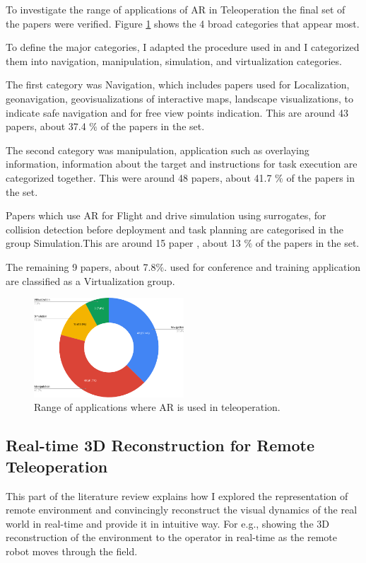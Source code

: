 To investigate the range of applications of AR in Teleoperation the final set of the papers were verified. Figure \ref{fig:range of applications} shows the 4 broad categories that appear most.
 
To define the  major categories, I adapted the procedure used in \cite{7912316} and I categorized them into navigation, manipulation, simulation, and virtualization categories.
 
The first category was Navigation, which includes papers used for Localization, geonavigation, geovisualizations of interactive maps, landscape visualizations, to indicate safe navigation and for free view points indication. This are around 43 papers, about 37.4 $\%$ of the papers in the set.
 
The second category was manipulation, application such as overlaying information, information about the target and instructions for task execution are categorized together. This were around 48 papers, about 41.7 $\%$ of the papers in the set.
 
Papers which use AR for Flight and drive simulation using surrogates, for collision detection before deployment and task planning are categorised in the group Simulation.This are around 15 paper , about 13 $\%$ of the papers in the set.
 
The remaining 9 papers, about 7.8$\%$. used for conference and training application are classified as a Virtualization group.
 
\begin{figure}[h]
    \centering
    \includegraphics[width=0.5\textwidth]{images/chart.png}
    \caption{Range of applications where AR is used in teleoperation.}
    \label{fig:range of applications}
\end{figure}

\subsection{Real-time 3D Reconstruction for Remote Teleoperation}

This part of the literature review explains how I explored the representation of remote environment and convincingly reconstruct the visual dynamics of the real world in real-time and provide it in intuitive way. For e.g., showing the 3D reconstruction of the environment to the operator in real-time as the remote robot moves through the field.


